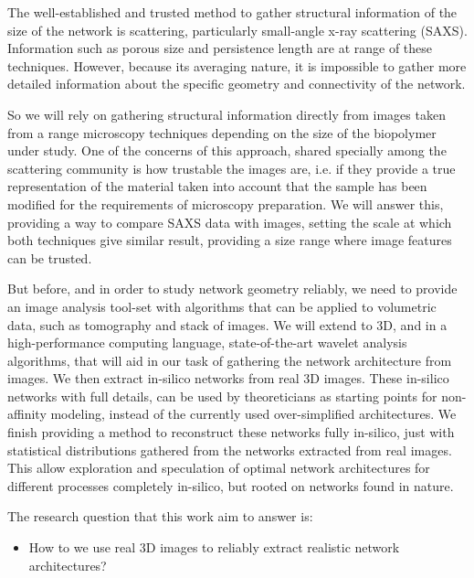 The well-established and trusted method to gather structural information of the size of the network
is scattering, particularly small-angle x-ray scattering (SAXS). Information such as porous
size and persistence length are at range of these techniques. However, because its
averaging nature, it is impossible to gather more detailed information about the specific geometry
and connectivity of the network.

So we will rely on gathering structural information directly from images taken from a range microscopy techniques depending on the size of the biopolymer under study.
One of the concerns of this approach, shared specially among the scattering community is how trustable the images are, i.e. if they provide a true representation of the material taken into account that the sample has been modified for the requirements of microscopy preparation. We will answer this, providing a way to compare SAXS data with images, setting the scale at which both techniques give similar result, providing a size range where image features can be trusted.

But before, and in order to study network geometry reliably, we need to provide an image analysis tool-set with algorithms that can be applied to volumetric data, such as tomography and stack of images.
We will extend to 3D, and in a high-performance computing language, state-of-the-art wavelet analysis algorithms, that will aid in our task of gathering the network architecture from images.
We then extract in-silico networks from real 3D images.
These in-silico networks with full details, can be used by theoreticians as starting points for non-affinity modeling, instead of the currently used over-simplified architectures.
We finish providing a method to reconstruct these networks fully in-silico, just with statistical
distributions gathered from the networks extracted from real images. This allow exploration and speculation of optimal network architectures for different processes completely in-silico, but rooted on networks found in nature.

The research question that this work aim to answer is:
\begin{itemize}
  \item How to we use real 3D images to reliably extract realistic network architectures?
\end{itemize}
